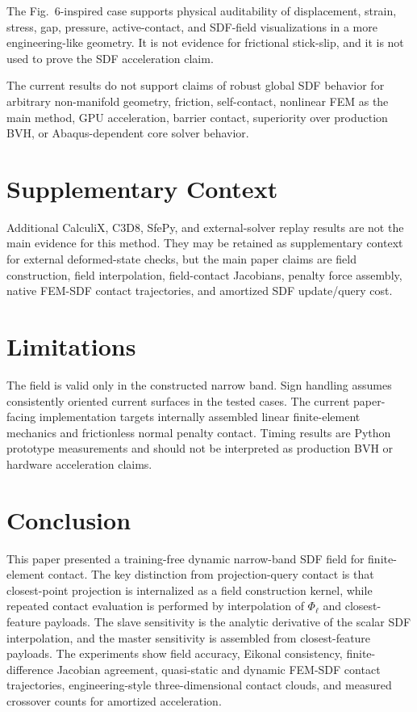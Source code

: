\documentclass[11pt]{article}
\begin{document}
The Fig.~6-inspired case supports physical auditability of displacement, strain, stress, gap, pressure, active-contact, and SDF-field visualizations in a more engineering-like geometry. It is not evidence for frictional stick-slip, and it is not used to prove the SDF acceleration claim.

The current results do not support claims of robust global SDF behavior for arbitrary non-manifold geometry, friction, self-contact, nonlinear FEM as the main method, GPU acceleration, barrier contact, superiority over production BVH, or Abaqus-dependent core solver behavior.

\section{Supplementary Context}

Additional CalculiX, C3D8, SfePy, and external-solver replay results are not the main evidence for this method. They may be retained as supplementary context for external deformed-state checks, but the main paper claims are field construction, field interpolation, field-contact Jacobians, penalty force assembly, native FEM-SDF contact trajectories, and amortized SDF update/query cost.

\section{Limitations}

The field is valid only in the constructed narrow band. Sign handling assumes consistently oriented current surfaces in the tested cases. The current paper-facing implementation targets internally assembled linear finite-element mechanics and frictionless normal penalty contact. Timing results are Python prototype measurements and should not be interpreted as production BVH or hardware acceleration claims.

\section{Conclusion}

This paper presented a training-free dynamic narrow-band SDF field for finite-element contact. The key distinction from projection-query contact is that closest-point projection is internalized as a field construction kernel, while repeated contact evaluation is performed by interpolation of \(\Phi_\ell\) and closest-feature payloads. The slave sensitivity is the analytic derivative of the scalar SDF interpolation, and the master sensitivity is assembled from closest-feature payloads. The experiments show field accuracy, Eikonal consistency, finite-difference Jacobian agreement, quasi-static and dynamic FEM-SDF contact trajectories, engineering-style three-dimensional contact clouds, and measured crossover counts for amortized acceleration.
\end{document}
